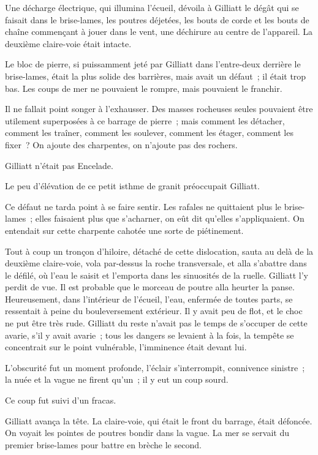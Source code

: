 \documentclass[french,twoside]{book} %
\begin{document}
Une décharge électrique, qui illumina l’écueil, dévoila à Gilliatt le dégât qui se faisait dans le brise-lames, les poutres déjetées, les bouts de corde et les bouts de chaîne commençant à jouer dans le vent, une déchirure au centre de l’appareil. La deuxième claire-voie était intacte.\par
Le bloc de pierre, si puissamment jeté par Gilliatt  dans l’entre-deux derrière le brise-lames, était la plus solide des barrières, mais avait un défaut ; il était trop bas. Les coups de mer ne pouvaient le rompre, mais pouvaient le franchir.\par
Il ne fallait point songer à l’exhausser. Des masses rocheuses seules pouvaient être utilement superposées à ce barrage de pierre ; mais comment les détacher, comment les traîner, comment les soulever, comment les étager, comment les fixer ? On ajoute des charpentes, on n’ajoute pas des rochers.\par
Gilliatt n’était pas Encelade.\par
Le peu d’élévation de ce petit isthme de granit préoccupait Gilliatt.\par
Ce défaut ne tarda point à se faire sentir. Les rafales ne quittaient plus le brise-lames ; elles faisaient plus que s’acharner, on eût dit qu’elles s’appliquaient. On entendait sur cette charpente cahotée une sorte de piétinement.\par
Tout à coup un tronçon d’hiloire, détaché de cette dislocation, sauta au delà de la deuxième claire-voie, vola par-dessus la roche transversale, et alla s’abattre dans le défilé, où l’eau le saisit et l’emporta dans les sinuosités de la ruelle. Gilliatt l’y perdit de vue. Il est probable que le morceau de poutre alla heurter la panse. Heureusement, dans l’intérieur de l’écueil, l’eau, enfermée de toutes parts, se ressentait à peine du bouleversement extérieur. Il y avait peu de flot, et le choc ne put être très rude. Gilliatt du reste n’avait pas le temps de s’occuper de cette avarie, s’il y avait avarie ; tous les dangers se levaient à la fois, la  tempête se concentrait sur le point vulnérable, l’imminence était devant lui.\par
L’obscurité fut un moment profonde, l’éclair s’interrompit, connivence sinistre ; la nuée et la vague ne firent qu’un ; il y eut un coup sourd.\par
Ce coup fut suivi d’un fracas.\par
Gilliatt avança la tête. La claire-voie, qui était le front du barrage, était défoncée. On voyait les pointes de poutres bondir dans la vague. La mer se servait du premier brise-lames pour battre en brèche le second.\par
\end{document}
